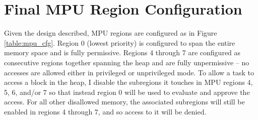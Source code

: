 \section{Final MPU Region Configuration}

Given the design described, MPU regions are configured as in Figure \ref{table:mpu_cfg}. Region 0 (lowest priority) is configured to span the entire memory space and is fully permissive. Regions 4 through 7 are configured as consecutive regions together spanning the heap and are fully unpermissive -- no accesses are allowed either in privileged or unprivileged mode. To allow a task to access a block in the heap, I disable the subregions it touches in MPU regions 4, 5, 6, and/or 7 so that instead region 0 will be used to evaluate and approve the access. For all other disallowed memory, the associated subregions will still be enabled in regions 4 through 7, and so access to it will be denied.



